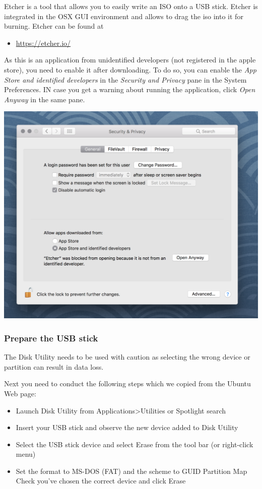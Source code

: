 Etcher is a tool that allows you to easily write an ISO onto a USB
stick. Etcher is integrated in the OSX GUI environment and allows to
drag the iso into it for burning. Etcher can be found at

\begin{itemize}
\item
  \url{https://etcher.io/}
\end{itemize}

As this is an application from unidentified developers (not registered
in the apple store), you need to enable it after downloading. To do so,
you can enable the \emph{App Store and identified developers} in the
\emph{Security and Privacy} pane in the System Preferences. IN case you
get a warning about running the application, click \emph{Open Anyway} in
the same pane.

\includegraphics[width=0.8\columnwidth]{images/49647529d8a4f32b.png}

\subsubsection{Prepare the USB stick}

\begin{WARNING}

The Disk Utility needs to be used with caution as selecting the
wrong device or partition can result in data loss.

\end{WARNING}

Next you need to conduct the following steps which we copied from the
Ubuntu Web page:

\begin{itemize}
\item
  Launch Disk Utility from Applications\textgreater{}Utilities or
  Spotlight search
\item
  Insert your USB stick and observe the new device added to Disk Utility
\item
  Select the USB stick device and select Erase from the tool bar (or
  right-click menu)
\item
  Set the format to MS-DOS (FAT) and the scheme to GUID Partition Map
  Check you've chosen the correct device and click Erase
\end{itemize}

